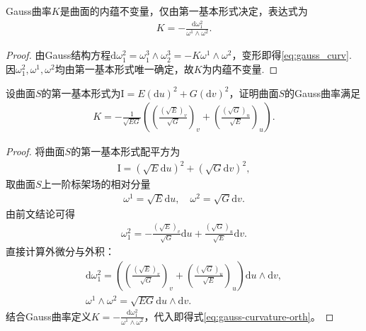 \documentclass[../../main.tex]{subfiles}%
\begin{document}
\begin{theorem}
Gauss曲率$K$是曲面的内蕴不变量，仅由第一基本形式决定，表达式为
\begin{align}
K = -\frac{\mathrm{d}\omega_1^2}{\omega^1\land\omega^2}. \label{eq:gauss_curv}
\end{align}
\end{theorem}

\begin{proof}

由Gauss结构方程$\mathrm{d}\omega_1^2=\omega_1^3\land\omega_2^3=-K\omega^1\land\omega^2$，变形即得\eqref{eq:gauss_curv}.
因$\omega_1^2,\omega^1,\omega^2$均由第一基本形式唯一确定，故$K$为内蕴不变量.

\end{proof}

\begin{example}
设曲面$S$的第一基本形式为$\mathrm{I}=E(\mathrm{d}u)^2+G(\mathrm{d}v)^2$，证明曲面$S$的Gauss曲率满足
\begin{align}
K=-\frac{1}{\sqrt{EG}}\left(\left(\frac{(\sqrt{E})_v}{\sqrt{G}}\right)_v+\left(\frac{(\sqrt{G})_u}{\sqrt{E}}\right)_u\right).
\label{eq:gauss-curvature-orth}
\end{align}
\end{example}

\begin{proof}

将曲面$S$的第一基本形式配平方为
\begin{align*}
\mathrm{I}=(\sqrt{E}\mathrm{d}u)^2+(\sqrt{G}\mathrm{d}v)^2,
\end{align*}
取曲面$S$上一阶标架场的相对分量
\begin{align*}
\omega^1=\sqrt{E}\mathrm{d}u,\quad \omega^2=\sqrt{G}\mathrm{d}v.
\end{align*}
由前文结论可得
\begin{align*}
\omega_1^2=-\frac{(\sqrt{E})_v}{\sqrt{G}}\mathrm{d}u+\frac{(\sqrt{G})_u}{\sqrt{E}}\mathrm{d}v.
\end{align*}
直接计算外微分与外积：
\begin{align*}
\mathrm{d}\omega_1^2=\left(\left(\frac{(\sqrt{E})_v}{\sqrt{G}}\right)_v+\left(\frac{(\sqrt{G})_u}{\sqrt{E}}\right)_u\right)\mathrm{d}u\wedge\mathrm{d}v,\\
\omega^1\wedge\omega^2=\sqrt{EG}\mathrm{d}u\wedge\mathrm{d}v.
\end{align*}
结合Gauss曲率定义$K=-\frac{\mathrm{d}\omega_1^2}{\omega^1\wedge\omega^2}$，代入即得式\eqref{eq:gauss-curvature-orth}。

\end{proof}
\end{document}
